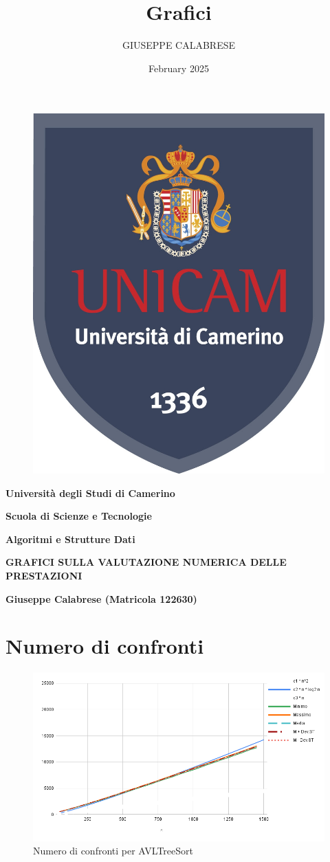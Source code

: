 \documentclass{article}
\title{Grafici}
\author{GIUSEPPE CALABRESE}
\date{February 2025}
\begin{document}
\begin{figure}[H]
    \centering
    \includegraphics[width=0.5\linewidth]{Logo Unicam/unicam.jpg}
    \label{fig:logo}
\end{figure}

\centering
{\Large \textbf{Università degli Studi di Camerino}     \par
    \vspace{1 cm}
        \Large \textbf{Scuola di Scienze e Tecnologie}  \par
        \Large \textbf{Algoritmi e Strutture Dati}      \par
    \vspace{3 cm}
        \Large \textbf{GRAFICI SULLA VALUTAZIONE NUMERICA DELLE PRESTAZIONI} \par
    \vspace{1 cm}
        \Large \textbf{Giuseppe Calabrese (Matricola 122630)}
}

\newpage

\section*{Numero di confronti}
\begin{figure}[H]
    \centering
    \includegraphics[width=0.98\linewidth]{Grafici/AVLTreeSort.png}
    \caption{Numero di confronti per AVLTreeSort}
    \label{fig:avl_confronti}
\end{figure}
\end{document}
